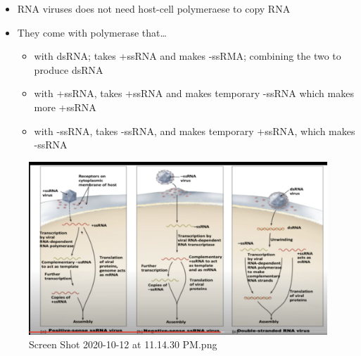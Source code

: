 \documentclass[letterpaper]{article}
\begin{document}
\begin{itemize}
\item RNA viruses does not need host-cell polymeraese to copy RNA
\item They come with polymerase that\ldots{}

\begin{itemize}
\item with dsRNA; takes +ssRNA and makes -ssRMA; combining the two to
produce dsRNA
\item with +ssRNA, takes +ssRNA and makes temporary -ssRNA which makes
more +ssRNA
\item with -ssRNA, takes -ssRNA, and makes temporary +ssRNA, which makes
-ssRNA
\end{itemize}
\end{itemize}

\begin{figure}[htbp]
\centering
\includegraphics[width=.9\linewidth]{Screen Shot 2020-10-12 at 11.14.30 PM.png}
\caption{Screen Shot 2020-10-12 at 11.14.30 PM.png}
\end{figure}
\end{document}
